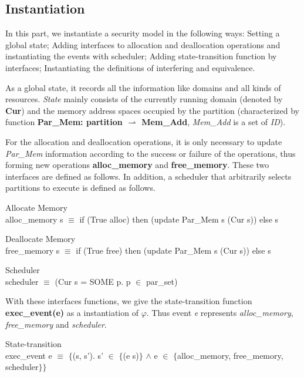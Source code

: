 \documentclass[runningheads]{llncs}
\begin{document}
\subsection{Instantiation}
In this part, we instantiate a security model in the following ways: Setting a global state; Adding interfaces to allocation and deallocation operations and instantiating the events with scheduler; Adding state-transition function by interfaces; Instantiating the definitions of interfering and equivalence.

As a global state, it records all the information like domains and all kinds of resources. \emph{State} mainly consists of the currently running domain (denoted by \textbf{Cur}) and the memory address spaces occupied by the partition (characterized by function \textbf{Par\_Mem: partition $\rightharpoonup$ Mem\_Add}, \emph{Mem\_Add} is a set of \emph{ID}).

For the allocation and deallocation operations, it is only necessary to update \emph{Par\_Mem} information according to the success or failure of the operations, thus forming new operations \textbf{alloc\_memory} and \textbf{free\_memory}. These two interfaces are defined as follows. In addition, a scheduler that arbitrarily selects partitions to execute is defined as follows.

\begin{definition} {Allocate Memory} \\
alloc\_memory s $\equiv$ if (True alloc) then (update Par\_Mem s (Cur s)) else s
\end{definition}

\begin{definition} {Deallocate Memory} \\
free\_memory s $\equiv$ if (True free) then (update Par\_Mem s (Cur s)) else s
\end{definition}

\begin{definition} {Scheduler} \\
scheduler $\equiv$ (Cur s = SOME p. p $\in$ par\_set)
\end{definition}

With these interfaces functions, we give the state-transition function \textbf{exec\_event(e)} as a instantiation of $\varphi$. Thus event \emph{e} represents \emph{alloc\_memory}, \emph{free\_memory} and \emph{scheduler}.

\begin{definition} {State-transition} \\
exec\_event e $\equiv$ $\lbrace$(s, s'). s' $\in$ $\lbrace$(e s)$\rbrace$ $\wedge$ e $\in$ $\lbrace$alloc\_memory, free\_memory, scheduler$\rbrace$$\rbrace$
\end{definition}
\end{document}
